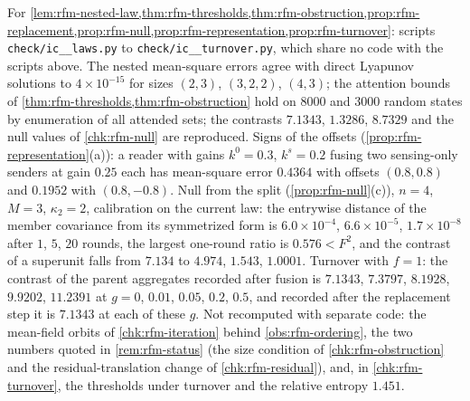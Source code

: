 \begin{numcheck}\label{chk:rfm-recheck}
For \cref{lem:rfm-nested-law,thm:rfm-thresholds,thm:rfm-obstruction,prop:rfm-replacement,prop:rfm-null,prop:rfm-representation,prop:rfm-turnover}: scripts \texttt{check/ic\_\_\allowbreak laws.py} to \texttt{check/ic\_\_\allowbreak turnover.py}, which share no code with the scripts above. The nested mean-square errors agree with direct Lyapunov solutions to $4\times10^{-15}$ for sizes $(2,3)$, $(3,2,2)$, $(4,3)$; the attention bounds of \cref{thm:rfm-thresholds,thm:rfm-obstruction} hold on $8000$ and $3000$ random states by enumeration of all attended sets; the contrasts $7.1343$, $1.3286$, $8.7329$ and the null values of \cref{chk:rfm-null} are reproduced. Signs of the offsets (\cref{prop:rfm-representation}(a)): a reader with gains $k^0=0.3$, $k^s=0.2$ fusing two sensing-only senders at gain $0.25$ each has mean-square error $0.4364$ with offsets $(0.8,0.8)$ and $0.1952$ with $(0.8,-0.8)$. Null from the split (\cref{prop:rfm-null}(c)), $n=4$, $M=3$, $\kappa_2=2$, calibration on the current law: the entrywise distance of the member covariance from its symmetrized form is $6.0\times10^{-4}$, $6.6\times10^{-5}$, $1.7\times10^{-8}$ after $1$, $5$, $20$ rounds, the largest one-round ratio is $0.576<F^2$, and the contrast of a superunit falls from $7.134$ to $4.974$, $1.543$, $1.0001$. Turnover with $f=1$: the contrast of the parent aggregates recorded after fusion is $7.1343$, $7.3797$, $8.1928$, $9.9202$, $11.2391$ at $g=0$, $0.01$, $0.05$, $0.2$, $0.5$, and recorded after the replacement step it is $7.1343$ at each of these $g$. Not recomputed with separate code: the mean-field orbits of \cref{chk:rfm-iteration} behind \cref{obs:rfm-ordering}, the two numbers quoted in \cref{rem:rfm-status} (the size condition of \cref{chk:rfm-obstruction} and the residual-translation change of \cref{chk:rfm-residual}), and, in \cref{chk:rfm-turnover}, the thresholds under turnover and the relative entropy $1.451$.
\end{numcheck}

